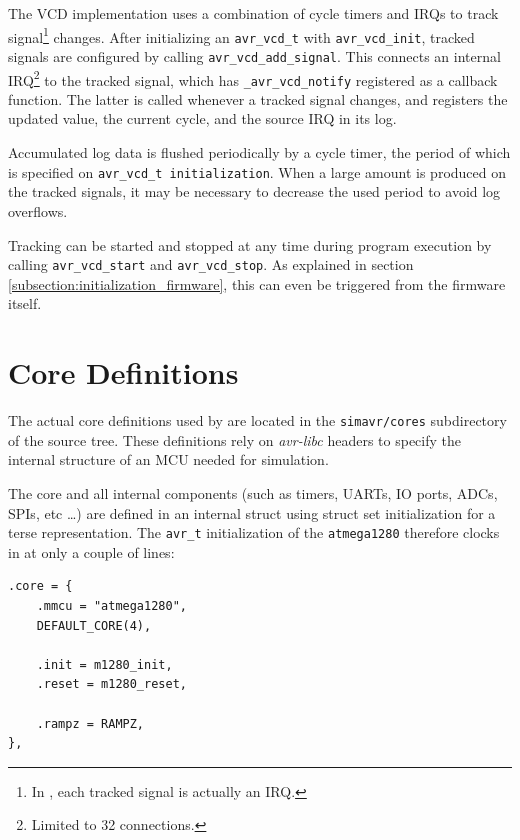 The \simavr \ac{VCD} implementation uses a combination of cycle timers
and \acp{IRQ} to track signal\footnote{
%
In \simavr, each tracked signal is actually an \ac{IRQ}.
%
} changes. After initializing an \lstinline|avr_vcd_t|
with \lstinline|avr_vcd_init|, tracked signals are configured by calling
\lstinline|avr_vcd_add_signal|. This connects an internal \ac{IRQ}\footnote{
Limited to 32 connections.} to the tracked signal, which has
\lstinline|_avr_vcd_notify| registered as a callback function. The latter is
called whenever a tracked signal changes, and registers the updated value, the
current cycle, and the source \ac{IRQ} in its log.

Accumulated log data is flushed periodically by a cycle timer, the period of
which is specified on \lstinline|avr_vcd_t initialization|. When a large amount
is produced on the tracked signals, it may be necessary to decrease the used
period to avoid log overflows.

Tracking can be started and stopped at any time during program execution by
calling \lstinline|avr_vcd_start| and \lstinline|avr_vcd_stop|. As explained in
section \ref{subsection:initialization_firmware}, this can even be triggered from the
firmware itself.


\section{Core Definitions}

The actual core definitions used by \simavr are located in the
\verb|simavr/cores| subdirectory of the source tree. These definitions rely on
\emph{avr-libc} headers to specify the internal structure of an \ac{MCU} needed
for simulation.

The core and all internal components (such as timers, \acp{UART}, \ac{IO} ports,
\acp{ADC}, \acp{SPI}, etc \ldots) are defined in an internal struct using struct
set initialization for a terse representation. The \lstinline|avr_t| initialization
of the \verb|atmega1280| therefore clocks in at only a couple of lines:

\begin{lstlisting}
.core = {
    .mmcu = "atmega1280",
    DEFAULT_CORE(4),

    .init = m1280_init,
    .reset = m1280_reset,

    .rampz = RAMPZ,
},
\end{lstlisting}

